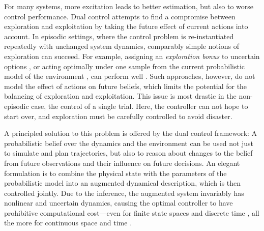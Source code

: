 For many systems, more excitation leads to better estimation, but also to worse
control performance. Dual control attempts to find a compromise between
exploration and exploitation by taking the future effect of current actions
%
%
%
%
%
into account. In episodic settings, where the control problem is
re-instantiated repeatedly with unchanged system dynamics, comparably simple
notions of exploration can succeed. For example, assigning an \emph{exploration
bonus} to uncertain options , or
acting optimally under one sample from the current probabilistic model of the
environment , can perform well
. Such approaches, however, do not model the
effect of actions on future beliefs, which limits the potential for the
balancing of exploration and exploitation. This issue is most drastic in the
non-episodic case, the control of a single trial. Here, the controller can not
hope to start over, and exploration must be carefully controlled to avoid
disaster.

A principled solution to this problem is offered by the dual control framework:
A probabilistic belief over the dynamics and the environment can be used not
%
%
%
%
%
%
%
%
%
%
just to simulate and plan trajectories, but also to reason about changes to the
belief from future observations and their influence on future decisions. An
elegant formulation is to combine the physical state with the parameters of the
probabilistic model into an augmented dynamical description, which is then
controlled jointly. Due to the inference, the augmented system invariably has
nonlinear and uncertain dynamics, causing the optimal controller to have
prohibitive computational cost---even for finite state spaces and discrete time
, all the more for continuous space
and time .

